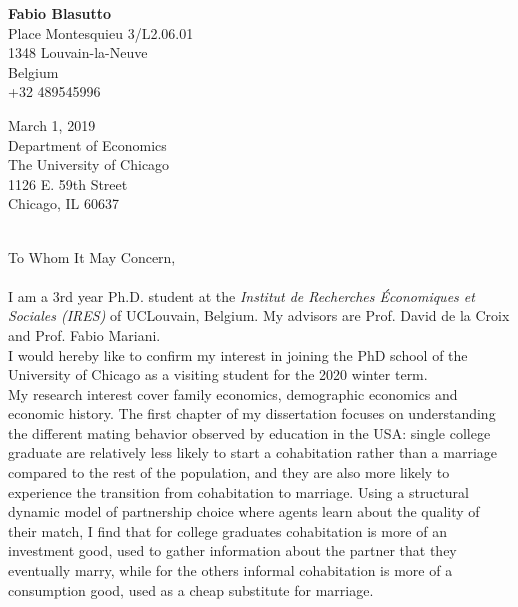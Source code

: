 \documentclass[12pt]{article}
\begin{document}
  {\parbox{\textwidth}{\raggedleft \textbf{Fabio Blasutto}\\ %
 Place Montesquieu 3/L2.06.01\\ %
 1348 Louvain-la-Neuve\\ %
 Belgium \\+32 489545996\\\vspace{0.2cm}}
  {\parbox{1.5\textwidth}{\raggedright March 1, 2019\\
  Department of Economics\\
The University of Chicago\\
1126 E. 59th Street\\
Chicago, IL 60637}}
\vspace{0.5cm}\\
To Whom It May Concern,\\
\vspace{0.5cm}\\
I am a 3rd year Ph.D. student at the \textit{Institut de Recherches \'Economiques et Sociales (IRES)} of UCLouvain, Belgium. My advisors are Prof. David de la Croix and Prof. Fabio Mariani.\vspace{0.3cm}\\
I would hereby like to confirm my interest in joining the PhD school of the University of Chicago as a visiting student for the 2020 winter term.\vspace{0.3cm}\\
My research interest cover family economics, demographic economics and economic history. The first chapter of my dissertation focuses on understanding the different mating behavior observed by education in the USA: single college graduate are relatively less likely to start a cohabitation rather than a marriage compared to the rest of the population, and they are also more likely to experience the transition from cohabitation to marriage. Using a structural dynamic model of partnership choice where agents learn about the quality of their match, I find that for college graduates cohabitation is more of an investment good, used to gather information about the partner that they eventually marry, while for the others informal cohabitation is more of a consumption good, used as a cheap substitute for marriage.\vspace{0.3cm}\\
}
\end{document}
